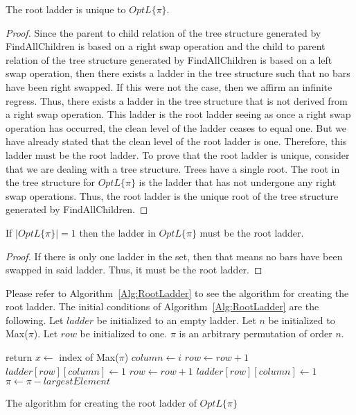 \begin{theorem}
	 The root ladder is unique to $OptL\{\pi\}$. 
	 \label{Theorem:One}
 \end{theorem} 
 \begin{proof}
	Since the parent to child relation of the tree structure generated by {\sc FindAllChildren} is based on a right swap operation 
	and the child to parent relation of the tree structure generated by {\sc FindAllChildren} is based on a left swap operation, then 
	there exists a ladder in the tree structure such that no bars have been right swapped. 
	If this were not the case, then we affirm an infinite regress. 
	Thus, there exists a ladder in the tree structure that is not derived from a right swap operation. This ladder 
	is the root ladder seeing as once a right swap operation has occurred, the clean level of the ladder 
	ceases to equal one. But we have already stated that the clean level of the root ladder is one. Therefore, 
	this ladder must be the root ladder. To prove that 
	the root ladder is unique, consider that we are dealing with a tree structure. Trees have a single 
	root. The root in the tree structure for $OptL\{\pi\}$ is the ladder that has not undergone any right swap operations.
	Thus, the root ladder is the unique root of the tree structure generated by {\sc FindAllChildren}.
   
 \end{proof}
 \begin{corollary}
	 If $|OptL\{\pi\}|=1$ then the ladder in $OptL\{\pi\}$ must be the root ladder.
 \end{corollary}
 \begin{proof}
	 If there is only one ladder in the set, then that means no bars have been swapped in said ladder. 
	 Thus, it must be the root ladder.
 \end{proof}
Please refer to Algorithm~\ref{Alg:RootLadder} to see the algorithm for creating 
the root ladder. The initial conditions of Algorithm~\ref{Alg:RootLadder} are the 
following. Let $ladder$ be initialized to an empty ladder. Let $n$ be initialized 
to {\sc Max($\pi$)}. Let $row$ be initialized to one. $\pi$ is an arbitrary permutation 
of order $n$.
\begin{algorithm}[!htp]
	\begin{algorithmic}[1]
				\State return
			\EndIf
			\State $x \gets$ index of {\sc Max($\pi$)}
					\State $column \gets i$
							\State $row \gets row+1$
						\EndWhile
						\State $ladder[row][column] \gets 1$
					\Else 
						\State $row \gets row+1$
						\State $ladder[row][column] \gets 1$
					\EndIf
				\EndIf
			\EndFor
			\State $\pi \gets \pi - largestElement$
		\EndFunction

	\end{algorithmic}
	\caption{The algorithm for creating the root ladder of $OptL\{\pi\}$}
	\label{Alg:RootLadder}
\end{algorithm}
